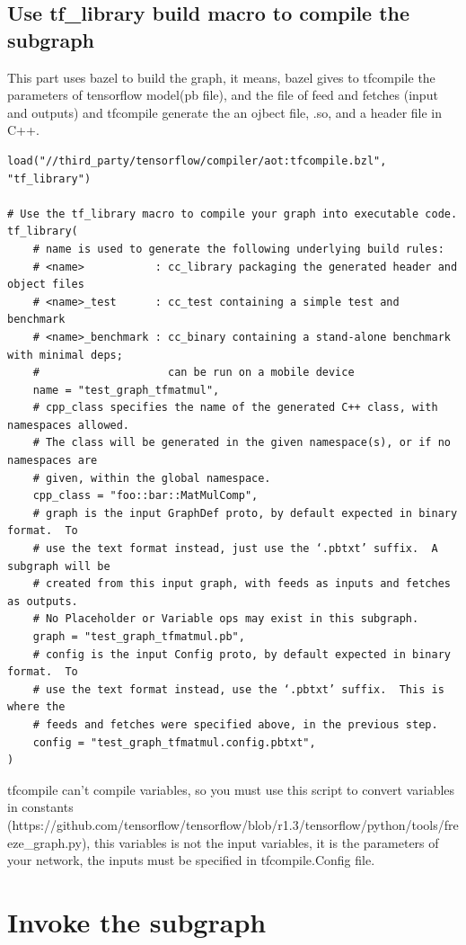 \documentclass[11pt,openany]{book}
\begin{document}
\subsection{Use tf\_library build macro to compile the subgraph}

This part uses bazel to build the graph, it means, bazel gives to tfcompile the parameters of tensorflow model(pb file), and the file of feed and fetches (input and outputs) and tfcompile generate the an ojbect file, .so, and a header file in C++.

\begin{verbatim}
load("//third_party/tensorflow/compiler/aot:tfcompile.bzl", "tf_library")

# Use the tf_library macro to compile your graph into executable code.
tf_library(
    # name is used to generate the following underlying build rules:
    # <name>           : cc_library packaging the generated header and object files
    # <name>_test      : cc_test containing a simple test and benchmark
    # <name>_benchmark : cc_binary containing a stand-alone benchmark with minimal deps;
    #                    can be run on a mobile device
    name = "test_graph_tfmatmul",
    # cpp_class specifies the name of the generated C++ class, with namespaces allowed.
    # The class will be generated in the given namespace(s), or if no namespaces are
    # given, within the global namespace.
    cpp_class = "foo::bar::MatMulComp",
    # graph is the input GraphDef proto, by default expected in binary format.  To
    # use the text format instead, just use the ‘.pbtxt’ suffix.  A subgraph will be
    # created from this input graph, with feeds as inputs and fetches as outputs.
    # No Placeholder or Variable ops may exist in this subgraph.
    graph = "test_graph_tfmatmul.pb",
    # config is the input Config proto, by default expected in binary format.  To
    # use the text format instead, use the ‘.pbtxt’ suffix.  This is where the
    # feeds and fetches were specified above, in the previous step.
    config = "test_graph_tfmatmul.config.pbtxt",
)
\end{verbatim}

tfcompile can't compile variables, so you must use this script to convert variables in constants (https://github.com/tensorflow/tensorflow/blob/r1.3/tensorflow/python/tools/freeze_graph.py), this variables is not the input variables, it is the parameters of your network, the inputs must be specified in tfcompile.Config file.

\section{Invoke the subgraph}
\end{document}
